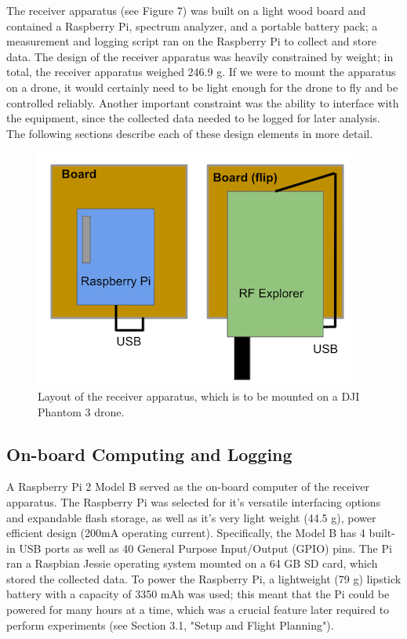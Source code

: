 \documentclass[pageno]{jpaper}
\begin{document}
The receiver apparatus (see Figure 7) was built on a light wood board and contained a Raspberry Pi, spectrum analyzer, and a portable battery pack; a measurement and logging script ran on the Raspberry Pi to collect and store data. The design of the receiver apparatus was heavily constrained by weight; in total, the receiver apparatus weighed 246.9 g. If we were to mount the apparatus on a drone, it would certainly need to be light enough for the drone to fly and be controlled reliably. Another important constraint was the ability to interface with the equipment, since the collected data needed to be logged for later analysis. The following sections describe each of these design elements in more detail.

\begin{figure}[h]
	\caption{Layout of the receiver apparatus, which is to be mounted on a DJI Phantom 3 drone.}
	\includegraphics{apparatus}
	\centering
\end{figure}

\subsection{On-board Computing and Logging}
A Raspberry Pi 2 Model B served as the on-board computer of the receiver apparatus. The Raspberry Pi was selected for it's versatile interfacing options and expandable flash storage, as well as it's very light weight (44.5 g), power efficient design (200mA operating current). Specifically, the Model B\cite{rpi} has 4 built-in USB ports as well as 40 General Purpose Input/Output (GPIO) pins. The Pi ran a Raspbian Jessie operating system mounted on a 64 GB SD card, which stored the collected data. To power the Raspberry Pi, a lightweight (79 g) lipstick battery with a capacity of 3350 mAh was used; this meant that the Pi could be powered for many hours at a time, which was a crucial feature later required to perform experiments (see Section 3.1, "Setup and Flight Planning"). 
\end{document}
